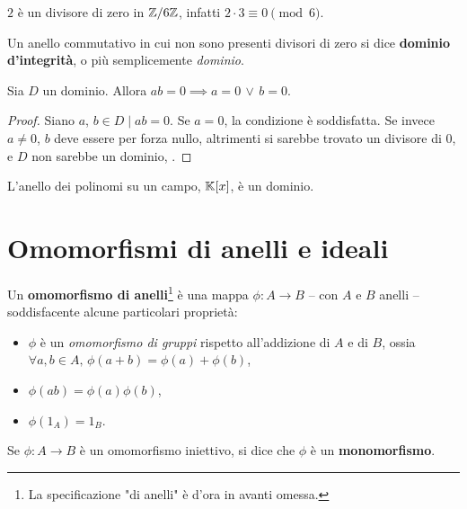 \documentclass[11pt]{scrbook}
\begin{document}
\begin{example}
    $2$ è un divisore di zero in $\mathbb Z/6\mathbb Z$, infatti $2 \cdot 3 \equiv 0 \pmod 6.$
\end{example}

\begin{definition}
    Un anello commutativo in cui non sono presenti divisori di zero si dice \textbf{dominio d'integrità},
    o più semplicemente \textit{dominio}.
\end{definition}

\begin{proposition}
    Sia $D$ un dominio. Allora $ab=0 \implies a=0 \,\lor\, b=0$.
\end{proposition}

\begin{proof}
    Siano $a$, $b \in D \mid ab = 0$. Se $a=0$, la condizione è soddisfatta.
    Se invece $a \neq 0$, $b$ deve essere per forza nullo, altrimenti si
    sarebbe trovato un divisore di $0$, e $D$ non sarebbe un dominio, \Lightning.
\end{proof}

\begin{example}
    L'anello dei polinomi su un campo, $\mathbb{K}[x]$, è un dominio.
\end{example}

\section{Omomorfismi di anelli e ideali}

\begin{definition}
    Un \textbf{omomorfismo di anelli}\footnote{La specificazione "di anelli" è d'ora in avanti omessa.} è una mappa $\phi : A \to B$ -- con
    $A$ e $B$ anelli -- soddisfacente alcune particolari proprietà:

    \begin{itemize}
        \item $\phi$ è un \textit{omomorfismo di gruppi} rispetto all'addizione
              di $A$ e di $B$, ossia $\forall a, b \in A, \, \phi(a+b)=\phi(a)+\phi(b)$,
        \item $\phi(ab)=\phi(a)\phi(b)$,
        \item $\phi(1_A)=1_B$.
    \end{itemize}
\end{definition}

\begin{definition}
    Se $\phi : A \to B$ è un omomorfismo iniettivo, si dice che
    $\phi$ è un \textbf{monomorfismo}.
\end{definition}
\end{document}
